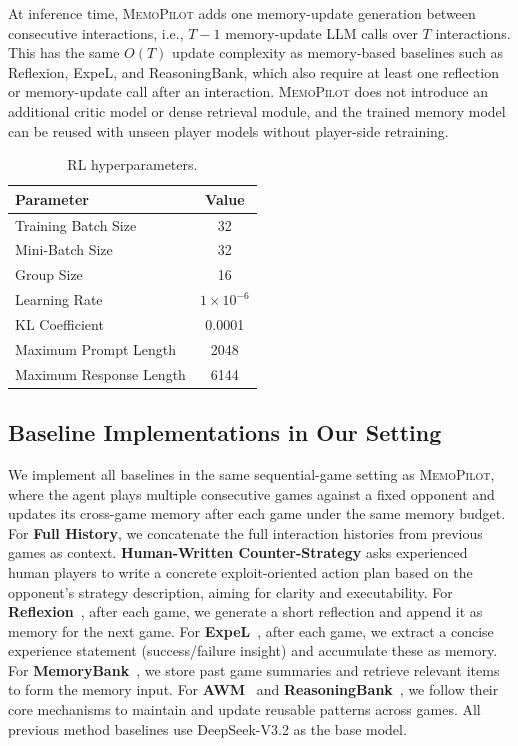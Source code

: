\documentclass{article}
\newcommand{\methodname}{MemoPilot}
\newcommand{\method}{\textsc{\methodname}}
\theoremstyle{plain}
\theoremstyle{definition}
\theoremstyle{remark}
\begin{document}
At inference time, \method{} adds one memory-update generation between consecutive interactions, i.e., $T-1$ memory-update LLM calls over $T$ interactions. This has the same $O(T)$ update complexity as memory-based baselines such as Reflexion, ExpeL, and ReasoningBank, which also require at least one reflection or memory-update call after an interaction. \method{} does not introduce an additional critic model or dense retrieval module, and the trained memory model can be reused with unseen player models without player-side retraining.

\begin{table}[h!]
\centering
\caption{RL hyperparameters.}
\label{tab:rl_hyperparameters}
\begin{tabular}{lc}
\toprule
\textbf{Parameter} & \textbf{Value} \\
\midrule
Training Batch Size & 32 \\
Mini-Batch Size & 32 \\
Group Size & 16 \\
Learning Rate & $1 \times 10^{-6}$ \\
KL Coefficient & 0.0001 \\
Maximum Prompt Length & 2048 \\
Maximum Response Length & 6144 \\
\bottomrule
\end{tabular}
\end{table}

\subsection{Baseline Implementations in Our Setting}\label{appendix:baseline_impl}
We implement all baselines in the same sequential-game setting as \method{}, where the agent plays multiple consecutive games against a fixed opponent and updates its cross-game memory after each game under the same memory budget.
For \textbf{Full History}, we concatenate the full interaction histories from previous games as context.  \textbf{Human-Written Counter-Strategy} asks experienced human players to write a concrete exploit-oriented action plan based on the opponent's strategy description, aiming for clarity and executability.
For \textbf{Reflexion}~\citep{shinn2024reflexion}, after each game, we generate a short reflection and append it as memory for the next game.
For \textbf{ExpeL}~\citep{zhao2024expel}, after each game, we extract a concise experience statement (success/failure insight) and accumulate these as memory.
For \textbf{MemoryBank}~\citep{zhong2023memorybank}, we store past game summaries and retrieve relevant items to form the memory input.
For \textbf{AWM}~\citep{wang2025agent} and \textbf{ReasoningBank}~\citep{ouyang2026reasoningbank}, we follow their core mechanisms to maintain and update reusable patterns across games.
All previous method baselines use DeepSeek-V3.2 as the base model.
\end{document}
